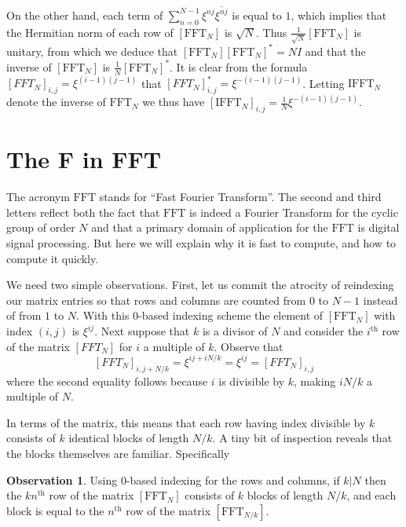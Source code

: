 \documentclass[12pt, letterpaper, oneside]{amsart}
\theoremstyle{definition}
\newtheorem{observation}[para]{Observation}
\theoremstyle{plain}
\numberwithin{equation}{para}
\numberwithin{figure}{section}
\newcommand{\FFT}{\text{FFT}}
\newcommand{\IFFT}{\text{IFFT}}
\renewcommand{\th}{\text{th}}
\begin{document}
On the other hand, each term of
$\sum_{n=0}^{N-1} \xi^{nj}\overline{\xi^{nj}}$ is equal to $1$, which
implies that the Hermitian norm of each row of $[\FFT_N]$ is
$\sqrt{N}$.  Thus $\frac{1}{\sqrt{N}}[\FFT_N]$ is unitary, from which
we deduce that $[\FFT_N][\FFT_N]^* = NI$ and that the inverse of
$[\FFT_N]$ is $\frac{1}{N}[\FFT_N]^*$.  It is clear from the formula
$[FFT_N]_{i, j} = \xi^{(i-1)(j-1)}$ that $[FFT_N]^*_{i, j} = \xi^{-(i-1)(j-1)}$.
Letting $\IFFT_N$ denote the inverse of $\FFT_N$ we thus have
$[\IFFT_N]_{i, j} = \frac{1}{N}\xi^{-(i-1)(j-1)}$.

\section{The F in FFT}

The acronym $\FFT$ stands for ``Fast Fourier Transform''.  The second and
third letters reflect both the fact that $\FFT$ is indeed a Fourier Transform
for the cyclic group of order $N$ and that a primary domain of application
for the $\FFT$ is digital signal processing.  But here we will explain why
it is fast to compute, and how to compute it quickly.

We need two simple observations.  First, let us commit the atrocity of
reindexing our matrix entries so that rows and columns are counted
from $0$ to $N-1$ instead of from $1$ to $N$.  With this $0$-based
indexing scheme the element of $[\FFT_N]$ with index $(i,j)$ is
$\xi^{ij}$.  Next suppose that $k$ is a divisor of $N$ and consider
the $i^\th$ row of the matrix $[FFT_N]$ for $i$ a multiple of $k$.
Observe that
$$[FFT_N]_{i,j+N/k} = \xi^{ij + iN/k} = \xi^{ij} = [FFT_N]_{i,j}$$
where the second equality follows because $i$ is divisible by $k$, making
$iN/k$ a multiple of $N$.

In terms of the matrix, this means that each row having index divisible
by $k$ consists of $k$ identical blocks of length $N/k$.  A tiny bit of
inspection reveals that the blocks themselves are familiar.  Specifically

\begin{observation}\label{observation:block}
Using $0$-based indexing for the rows and columns, if $k|N$ then the
$kn^\th$ row of the matrix $[\FFT_N]$ consists of $k$ blocks of length
$N/k$, and each block is equal to the $n^\th$ row of the matrix
$[\FFT_{N/k}]$.
\end{observation}
\end{document}
